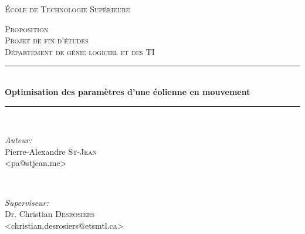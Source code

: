 \documentclass[11pt]{article}
\begin{document}
\pagestyle{fancy}


\begin{titlepage}
\thispagestyle{fancy}

\newcommand{\HRule}{\rule{\linewidth}{0.5mm}} %

\center %
 

\textsc{\LARGE École de Technologie Supérieure}\\[1.5cm] %

\vfill

\textsc{\Large Proposition}\\[0.5cm] %
\textsc{\large Projet de fin d'études \\ Département de génie logiciel et des TI}\\[0.5cm] %



\HRule \\[0.4cm]
{ \huge \bfseries Optimisation des paramètres d’une éolienne en mouvement}\\[0.4cm] %
\HRule \\[1.5cm]
\vfill
 

\begin{minipage}{0.4\textwidth}
\begin{flushleft} \large
\emph{Auteur:}\\
Pierre-Alexandre \textsc{St-Jean}\\
\small{<pa@stjean.me>}
\end{flushleft}
\end{minipage}
~
\begin{minipage}{0.4\textwidth}
\begin{flushright} \large
\emph{Superviseur:} \\
Dr. Christian \textsc{Desrosiers}\\
\small{<christian.desrosiers@etsmtl.ca>}
\end{flushright}
\end{minipage}\\[4cm]


\end{titlepage}
\end{document}

